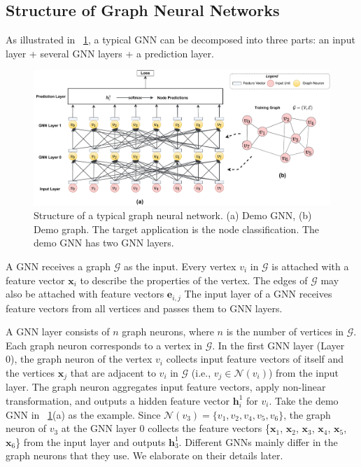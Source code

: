 \subsection{Structure of Graph Neural Networks}

As illustrated in \figurename~\ref{fig:general_structure_of_gnn}, a typical GNN can be decomposed into three parts: an input layer + several GNN layers + a prediction layer.

\begin{figure}
    \centering
    \includegraphics[width=1\columnwidth]{figs/illustration/GNN_common_architecture.pdf}
    \caption{Structure of a typical graph neural network. (a) Demo GNN, (b) Demo graph. The target application is the node classification. The demo GNN has two GNN layers.}
    \label{fig:general_structure_of_gnn}
\end{figure}

A GNN receives a graph $\mathcal{G}$ as the input.
Every vertex $v_i$ in $\mathcal{G}$ is attached with a feature vector $\boldsymbol{x}_i$ to describe the properties of the vertex.
The edges of $\mathcal{G}$ may also be attached with feature vectors $\boldsymbol{e}_{i,j}$
The input layer of a GNN receives feature vectors from all vertices and passes them to GNN layers.

A GNN layer consists of $n$ graph neurons, where $n$ is the number of vertices in $\mathcal{G}$.
Each graph neuron corresponds to a vertex in $\mathcal{G}$.
In the first GNN layer (Layer 0), the graph neuron of the vertex $v_i$ collects input feature vectors of itself and the vertices $\boldsymbol{x}_j$ that are adjacent to $v_i$ in $\mathcal{G}$ (i.e., $v_j \in \mathcal{N}(v_i)$) from the input layer.
The graph neuron aggregates input feature vectors, apply non-linear transformation, and outputs a hidden feature vector $\boldsymbol{h}^1_i$ for $v_i$.
Take the demo GNN in \figurename~\ref{fig:general_structure_of_gnn}(a) as the example.
Since $\mathcal{N}(v_3) = \{v_1, v_2, v_4, v_5, v_6\}$, the graph neuron of $v_3$ at the GNN layer 0 collects the feature vectors \{$\boldsymbol{x}_1$, $\boldsymbol{x}_2$, $\boldsymbol{x}_3$, $\boldsymbol{x}_4$, $\boldsymbol{x}_5$, $\boldsymbol{x}_6$\} from the input layer and outputs $\boldsymbol{h}^1_3$.
Different GNNs mainly differ in the graph neurons that they use.
We elaborate on their details later.

